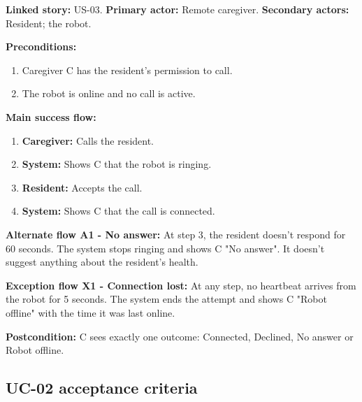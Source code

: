 \documentclass[12pt,letterpaper]{article}
\begin{document}
\textbf{Linked story:} US-03. \textbf{Primary actor:} Remote caregiver. \textbf{Secondary actors:} Resident; the robot.

\textbf{Preconditions:}

\begin{enumerate}\setlength{\itemsep}{2pt}

\item Caregiver C has the resident's permission to call.

\item The robot is online and no call is active.

\end{enumerate}

\textbf{Main success flow:}

\begin{enumerate}\setlength{\itemsep}{2pt}

\item \textbf{Caregiver:} Calls the resident.

\item \textbf{System:} Shows C that the robot is ringing.

\item \textbf{Resident:} Accepts the call.

\item \textbf{System:} Shows C that the call is connected.

\end{enumerate}

\textbf{Alternate flow A1 - No answer:} At step 3, the resident doesn't respond for 60 seconds. The system stops ringing and shows C "No answer". It doesn't suggest anything about the resident's health.

\textbf{Exception flow X1 - Connection lost:} At any step, no heartbeat arrives from the robot for 5 seconds. The system ends the attempt and shows C "Robot offline" with the time it was last online.

\textbf{Postcondition:} C sees exactly one outcome: Connected, Declined, No answer or Robot offline.

\subsection*{UC-02 acceptance criteria}
\end{document}
